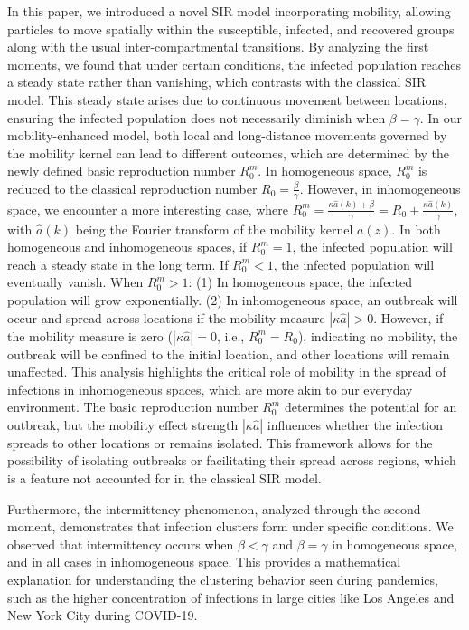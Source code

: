 \documentclass[sn-basic]{sn-jnl}%
\theoremstyle{thmstyleone}%
\theoremstyle{thmstyletwo}%
\theoremstyle{thmstylethree}%
\numberwithin{equation}{theorem}
\begin{document}
In this paper, we introduced a novel SIR model incorporating mobility, allowing particles to move spatially within the susceptible, infected, and recovered groups along with the usual inter-compartmental transitions. By analyzing the first moments, we found that under certain conditions, the infected population reaches a steady state rather than vanishing, which contrasts with the classical SIR model. This steady state arises due to continuous movement between locations, ensuring the infected population does not necessarily diminish when $\beta = \gamma$. In our mobility-enhanced model, both local and long-distance movements governed by the mobility kernel can lead to different outcomes, which are determined by the newly defined basic reproduction number $R_0^m$. In homogeneous space, $R_0^m$ is reduced to the classical reproduction number $R_0=\displaystyle\frac{\beta}{\gamma}$. However, in inhomogeneous space, we encounter a more interesting case, where $R_0^m=\displaystyle\frac{\kappa \hat{a}(k)+\beta}{\gamma}=R_0+\frac{\kappa \hat{a}(k)}{\gamma}$, with $\hat{a}(k)$ being the Fourier transform of the mobility kernel $a(z)$. In both homogeneous and inhomogeneous spaces, if $R_0^m=1$, the infected population will reach a steady state in the long term. If $R_0^m<1$, the infected population will eventually vanish. When $R_0^m>1$: (1) In homogeneous space, the infected population will grow exponentially. (2) In inhomogeneous space, an outbreak will occur and spread across locations if the mobility measure $|\kappa \hat{a}|>0$. However, if the mobility measure is zero ($|\kappa \hat{a}|=0$, i.e., $R_0^m=R_0$), indicating no mobility, the outbreak will be confined to the initial location, and other locations will remain unaffected. This analysis highlights the critical role of mobility in the spread of infections in inhomogeneous spaces, which are more akin to our everyday environment. The basic reproduction number $R_0^m$ determines the potential for an outbreak, but the mobility effect strength $|\kappa \hat{a}|$ influences whether the infection spreads to other locations or remains isolated. This framework allows for the possibility of isolating outbreaks or facilitating their spread across regions, which is a feature not accounted for in the classical SIR model.

Furthermore, the intermittency phenomenon, analyzed through the second moment, demonstrates that infection clusters form under specific conditions. We observed that intermittency occurs when $\beta < \gamma$ and $\beta = \gamma$ in homogeneous space, and in all cases  in inhomogeneous space. This provides a mathematical explanation for understanding the clustering behavior seen during pandemics, such as the higher concentration of infections in large cities like Los Angeles and New York City during COVID-19. 
\end{document}
